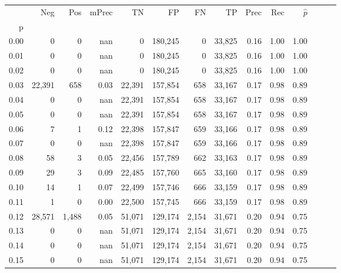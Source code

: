 \begin{tabular}{rrrrrrrrrrrrrr}
\toprule
{} &     Neg &    Pos & mPrec &       TN &       FP &      FN &      TP &  Prec &   Rec & $\hat{p}$ \\
p    &         &        &       &          &          &         &         &       &       &           \\
\midrule
0.00 &       0 &      0 &   nan &        0 &  180,245 &       0 &  33,825 &  0.16 &  1.00 &      1.00 \\
0.01 &       0 &      0 &   nan &        0 &  180,245 &       0 &  33,825 &  0.16 &  1.00 &      1.00 \\
0.02 &       0 &      0 &   nan &        0 &  180,245 &       0 &  33,825 &  0.16 &  1.00 &      1.00 \\
0.03 &  22,391 &    658 &  0.03 &   22,391 &  157,854 &     658 &  33,167 &  0.17 &  0.98 &      0.89 \\
0.04 &       0 &      0 &   nan &   22,391 &  157,854 &     658 &  33,167 &  0.17 &  0.98 &      0.89 \\
0.05 &       0 &      0 &   nan &   22,391 &  157,854 &     658 &  33,167 &  0.17 &  0.98 &      0.89 \\
0.06 &       7 &      1 &  0.12 &   22,398 &  157,847 &     659 &  33,166 &  0.17 &  0.98 &      0.89 \\
0.07 &       0 &      0 &   nan &   22,398 &  157,847 &     659 &  33,166 &  0.17 &  0.98 &      0.89 \\
0.08 &      58 &      3 &  0.05 &   22,456 &  157,789 &     662 &  33,163 &  0.17 &  0.98 &      0.89 \\
0.09 &      29 &      3 &  0.09 &   22,485 &  157,760 &     665 &  33,160 &  0.17 &  0.98 &      0.89 \\
0.10 &      14 &      1 &  0.07 &   22,499 &  157,746 &     666 &  33,159 &  0.17 &  0.98 &      0.89 \\
0.11 &       1 &      0 &  0.00 &   22,500 &  157,745 &     666 &  33,159 &  0.17 &  0.98 &      0.89 \\
0.12 &  28,571 &  1,488 &  0.05 &   51,071 &  129,174 &   2,154 &  31,671 &  0.20 &  0.94 &      0.75 \\
0.13 &       0 &      0 &   nan &   51,071 &  129,174 &   2,154 &  31,671 &  0.20 &  0.94 &      0.75 \\
0.14 &       0 &      0 &   nan &   51,071 &  129,174 &   2,154 &  31,671 &  0.20 &  0.94 &      0.75 \\
0.15 &       0 &      0 &   nan &   51,071 &  129,174 &   2,154 &  31,671 &  0.20 &  0.94 &      0.75 \\

\end{tabular}
